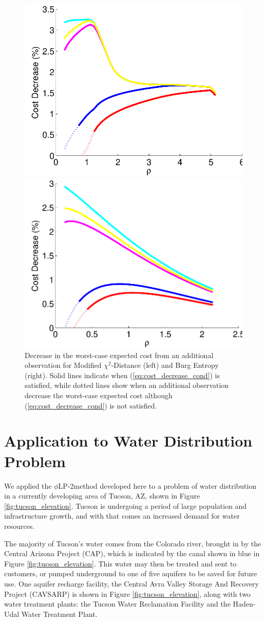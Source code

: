 \documentclass[opre,nonblindrev]{informs3} %
\newcommand{\plp}{$\phi$LP-2}
\begin{document}
\begin{figure}
	\FIGURE
	{%
		\includegraphics*[width=.45\textwidth]{images/mchi2_decrease_condition}%
		\includegraphics*[width=.45\textwidth]{images/burg_decrease_condition}%
	}
	{
		Decrease in the worst-case expected cost from an additional observation  for Modified $\chi^2$-Distance (left) and Burg Entropy (right).
		Solid lines indicate when (\ref{eq:cost_decrease_cond}) is satisfied, while dotted lines show when an additional observation decrease the worst-case expected cost although (\ref{eq:cost_decrease_cond}) is not satisfied.
		\label{fig:value}
	}
	{}
\end{figure}

\section{Application to Water Distribution Problem}
\label{sec:water}

We applied the \plp method developed here to a problem of water distribution in a currently developing area of Tucson, AZ, shown in Figure \ref{fig:tucson_elevation}.
Tucson is undergoing a period of large population and infrastructure growth, and with that comes an increased demand for water resources.

The majority of Tucson's water comes from the Colorado river, brought in by the Central Arizona Project (CAP), which is indicated by the canal shown in blue in Figure \ref{fig:tucson_elevation}.
This water may then be treated and sent to customers, or pumped underground to one of five aquifers to be saved for future use.
One aquifer recharge facility, the Central Avra Valley Storage And Recovery Project (CAVSARP) is shown in Figure \ref{fig:tucson_elevation}, along with two water treatment plants: the Tucson Water Reclamation Facility and the Haden-Udal Water Treatment Plant.
\end{document}
